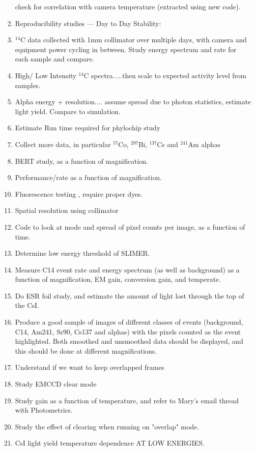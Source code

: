 \documentclass[11pt]{article}
\newcommand{\nuc}[2]{\ensuremath{^{#1}}#2}
\begin{document}
\begin{enumerate}
check for correlation with camera temperature (extracted using new code).
\item Reproducibility studies --- Day to Day Stability: \item \nuc{14}{C} data collected with 1mm collimator over multiple days, with camera and equipment power cycling in between.	 
Study energy spectrum and rate for each sample and compare.
\item High/ Low Intensity \nuc{14}{C} spectra.....then scale to expected activity level from samples. 
\item Alpha energy + resolution.... assume spread due to photon statistics, estimate light yield. Compare to simulation.
\item Estimate Run time required for phylochip study
\item Collect more data, in particular \nuc{57}{Co}, \nuc{207}{Bi}, \nuc{137}{Cs} and \nuc{241}{Am} alphas
\item BERT study, as a function of magnification.
\item Performance/rate as a function of magnification.
\item Fluorescence testing , require proper dyes.
\item Spatial resolution using collimator
\item Code to look at mode and spread of pixel counts per image, as a function of time.
\item Determine low energy threshold of SLIMER. 
\item Measure C14 event rate and energy spectrum (as well as background) as a function of magnification, EM gain, conversion gain, and temperate. 
\item Do ESR foil study, and estimate the amount of light lost through the top of the CsI. 
\item Produce a good sample of images of different classes of events (background, C14, Am241, Sr90, Cs137 and alphas) with the pixels counted as the event highlighted. Both smoothed and unsmoothed data should be displayed, and this should be done at different magnifications. 
\item Understand if we want to keep overlapped frames
\item Study EMCCD clear mode
\item Study gain as a function of temperature, and refer to Mary's email thread with Photometrics. 
\item Study the effect of clearing when running on "overlap" mode.   
\item CsI light yield temperature dependence AT LOW ENERGIES.
\end{enumerate} 
 
 

\end{document}
